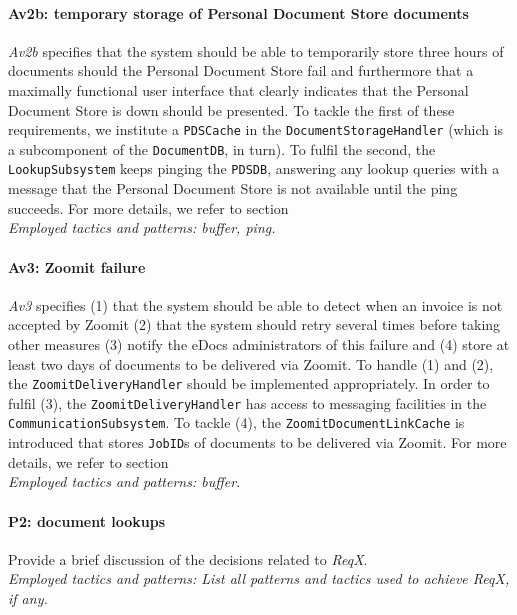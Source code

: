 \documentclass[a4paper,10pt]{article}
\begin{document}
\paragraph{Av2b\@: temporary storage of Personal Document Store documents} \emph{Av2b} specifies that the system should be able to temporarily store three hours of documents should the Personal Document Store fail and furthermore that a maximally functional user interface that clearly indicates that the Personal Document Store is down should be presented. To tackle the first of these requirements, we institute a \texttt{PDSCache} in the \texttt{DocumentStorageHandler} (which is a subcomponent of the \texttt{DocumentDB}, in turn). To fulfil the second, the \texttt{LookupSubsystem} keeps pinging the \texttt{PDSDB}, answering any lookup queries with a message that the Personal Document Store is not available until the ping succeeds. For more details, we refer to section \\
\emph{Employed tactics and patterns: buffer, ping.}
    
\paragraph{Av3\@: Zoomit failure} \emph{Av3} specifies (1) that the system should be able to detect when an invoice is not accepted by Zoomit (2) that the system should retry several times before taking other measures (3) notify the eDocs administrators of this failure and (4) store at least two days of documents to be delivered via Zoomit. To handle (1) and (2), the \texttt{ZoomitDeliveryHandler} should be implemented appropriately. In order to fulfil (3), the \texttt{ZoomitDeliveryHandler} has access to messaging facilities in the \texttt{CommunicationSubsystem}. To tackle (4), the \texttt{ZoomitDocumentLinkCache} is introduced that stores \texttt{JobID}s of documents to be delivered via Zoomit. For more details, we refer to section \\
\emph{Employed tactics and patterns: buffer.}
    
\paragraph{P2\@: document lookups} Provide a brief discussion of the
decisions related to \emph{ReqX}.\\
\emph{Employed tactics and patterns: List all patterns and tactics used to
    achieve ReqX, if any.}
    
\end{document}
